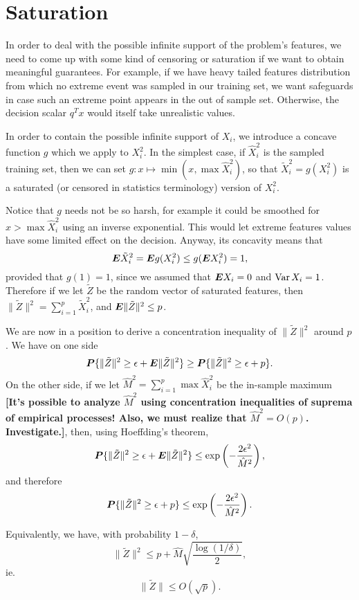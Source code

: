 \documentclass[11pt]{article}
\begin{document}
\section{Saturation}
In order to deal with the possible infinite support of the problem's features, we need to
come up with some kind of censoring or saturation if we want to obtain meaningful
guarantees. For example, if we have heavy tailed features distribution from which no
extreme event was sampled in our training set, we want safeguards in case such an extreme
point appears in the out of sample set. Otherwise, the decision scalar $q^Tx$ would
itself take unrealistic values. 

In order to contain the possible infinite support of $X_i$, we introduce a concave
function $g$ which we apply to $X_i^2$. In the simplest case, if $\hat X_i^2$ is the
sampled training set, then we can set $g:x\mapsto \min(x,\max\hat X_i^2)$, so that $\tilde
X^2_i = g(X_i^2)$ is a saturated (or censored in statistics terminology) version of
$X_i^2$. 

Notice that $g$ needs not be so harsh, for example it could be smoothed for
$x>\max \hat X_i^2$ using an inverse exponential. This would let extreme features values
have some limited effect on the decision. Anyway, its concavity means that
\[
\bm E \tilde X^2_i = \bm E g(X_i^2) \leq g(\bm E X_i^2) = 1,
\]
provided that $g(1) = 1$, since we assumed that $\bm E X_i=0$ and $\operatorname{Var} X_i=1$. Therefore if
we let $\tilde Z$ be the random vector of saturated features, then
$\|\tilde Z\|^2 = \sum_{i=1}^p\tilde X^2_i$, and $\bm E\|\tilde Z\|^2\leq p$.

We are now in a position to derive a concentration inequality of $\|\tilde Z\|^2$ around
$p$. We have on one side
\[
  \bm P\{\|\tilde Z\|^2 \geq \epsilon + \bm E\|\tilde Z\|^2\} \geq \bm P\{\|\tilde Z\|^2
  \geq \epsilon + p\}.
\]
On the other side, if we let $\hat M^2 = \sum_{i=1}^p \max \hat X^2_i$ be the in-sample
maximum \textbf{[It's possible to analyze $\hat M^2$ using concentration inequalities of
  suprema of empirical processes!  Also, we must realize that $\hat M^2 =
  O(p)$. Investigate.]}, then, using Hoeffding's theorem,
\[
  \bm P\{\|\tilde Z\|^2 \geq \epsilon + \bm E\|\tilde Z\|^2\} \leq
  \exp\left(-\frac{2\epsilon^2}{\hat M^2}\right),
\]
and therefore
\[
  \bm P\{\|\tilde Z\|^2 \geq \epsilon + p\} \leq \exp\left(-\frac{2\epsilon^2}{{\hat M}^2}\right). 
\]

Equivalently, we have, with probability $1-\delta$, 
\[
  \|\tilde Z\|^2 \leq p + \hat M\sqrt{\frac{\log(1/\delta)}{2}},
\]
ie. 
\[
  \|\tilde Z\| \leq O(\sqrt{p}).
\]

\newpage

\end{document}
